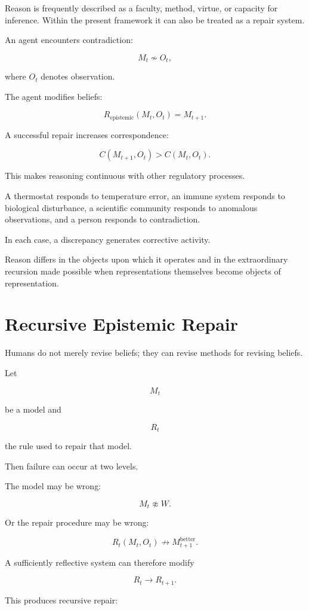 \documentclass[11pt,oneside]{book}
\theoremstyle{definition}
\theoremstyle{remark}
\begin{document}
Reason is frequently described as a faculty, method, virtue, or capacity for inference. Within the present framework it can also be treated as a repair system.

An agent encounters contradiction:

\[
M_t
\not\sim
O_t,
\]

where \(O_t\) denotes observation.

The agent modifies beliefs:

\[
R_{\mathrm{epistemic}}(M_t,O_t)
=
M_{t+1}.
\]

A successful repair increases correspondence:

\[
C(M_{t+1},O_t)
>
C(M_t,O_t).
\]

This makes reasoning continuous with other regulatory processes.

A thermostat responds to temperature error, an immune system responds to biological disturbance, a scientific community responds to anomalous observations, and a person responds to contradiction.

In each case, a discrepancy generates corrective activity.

Reason differs in the objects upon which it operates and in the extraordinary recursion made possible when representations themselves become objects of representation.

\section{Recursive Epistemic Repair}

Humans do not merely revise beliefs; they can revise methods for revising beliefs.

Let

\[
M_t
\]

be a model and

\[
R_t
\]

the rule used to repair that model.

Then failure can occur at two levels.

The model may be wrong:

\[
M_t\not\approx W.
\]

Or the repair procedure may be wrong:

\[
R_t(M_t,O_t)
\not\rightarrow
M_{t+1}^{\mathrm{better}}.
\]

A sufficiently reflective system can therefore modify

\[
R_t\rightarrow R_{t+1}.
\]

This produces recursive repair:
\end{document}
